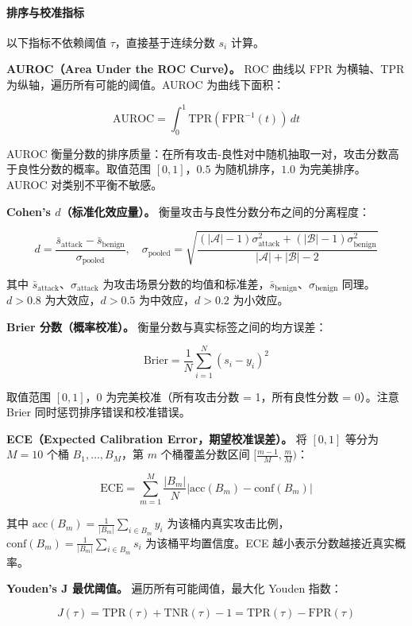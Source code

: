 \documentclass[a4paper]{ctexart}
\makeatletter
\renewcommand{\_}{%
  \ifmmode
    \nfss@text{\textunderscore}%
  \else
    \textunderscore\discretionary{}{}{}%
  \fi}
\makeatother
\begin{document}
\paragraph{排序与校准指标}


以下指标不依赖阈值 $\tau$，直接基于连续分数 $s_i$ 计算。


\textbf{AUROC（Area Under the ROC Curve）。} ROC 曲线以 FPR 为横轴、TPR 为纵轴，遍历所有可能的阈值。AUROC 为曲线下面积：


$$
\text{AUROC} = \int_{0}^{1} \text{TPR}(\text{FPR}^{-1}(t)) \, dt
$$


AUROC 衡量分数的排序质量：在所有攻击-良性对中随机抽取一对，攻击分数高于良性分数的概率。取值范围 $[0,1]$，$0.5$ 为随机排序，$1.0$ 为完美排序。AUROC 对类别不平衡不敏感。


\textbf{Cohen's $d$（标准化效应量）。} 衡量攻击与良性分数分布之间的分离程度：


$$
d = \frac{\bar{s}_{\text{attack}} - \bar{s}_{\text{benign}}}{\sigma_{\text{pooled}}}, \quad \sigma_{\text{pooled}} = \sqrt{\frac{(|\mathcal{A}|-1)\sigma_{\text{attack}}^2 + (|\mathcal{B}|-1)\sigma_{\text{benign}}^2}{|\mathcal{A}| + |\mathcal{B}| - 2}}
$$


其中 $\bar{s}_{\text{attack}}$、$\sigma_{\text{attack}}$ 为攻击场景分数的均值和标准差，$\bar{s}_{\text{benign}}$、$\sigma_{\text{benign}}$ 同理。$d > 0.8$ 为大效应，$d > 0.5$ 为中效应，$d > 0.2$ 为小效应。


\textbf{Brier 分数（概率校准）。} 衡量分数与真实标签之间的均方误差：


$$
\text{Brier} = \frac{1}{N} \sum_{i=1}^{N} (s_i - y_i)^2
$$


取值范围 $[0,1]$，$0$ 为完美校准（所有攻击分数 = 1，所有良性分数 = 0）。注意 Brier 同时惩罚排序错误和校准错误。


\textbf{ECE（Expected Calibration Error，期望校准误差）。} 将 $[0,1]$ 等分为 $M=10$ 个桶 $B_1, \dots, B_M$，第 $m$ 个桶覆盖分数区间 $[\frac{m-1}{M}, \frac{m}{M})$：


$$
\text{ECE} = \sum_{m=1}^{M} \frac{|B_m|}{N} \left| \text{acc}(B_m) - \text{conf}(B_m) \right|
$$


其中 $\text{acc}(B_m) = \frac{1}{|B_m|}\sum_{i \in B_m} y_i$ 为该桶内真实攻击比例，$\text{conf}(B_m) = \frac{1}{|B_m|}\sum_{i \in B_m} s_i$ 为该桶平均置信度。ECE 越小表示分数越接近真实概率。


\textbf{Youden's J 最优阈值。} 遍历所有可能阈值，最大化 Youden 指数：


$$
J(\tau) = \text{TPR}(\tau) + \text{TNR}(\tau) - 1 = \text{TPR}(\tau) - \text{FPR}(\tau)
$$
\end{document}
